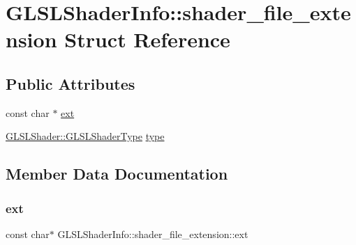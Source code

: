 \hypertarget{struct_g_l_s_l_shader_info_1_1shader__file__extension}{}\section{G\+L\+S\+L\+Shader\+Info\+::shader\+\_\+file\+\_\+extension Struct Reference}
\label{struct_g_l_s_l_shader_info_1_1shader__file__extension}
\subsection*{Public Attributes}
\begin{DoxyCompactItemize}
\item 
const char $\ast$ \mbox{\hyperlink{struct_g_l_s_l_shader_info_1_1shader__file__extension_a9afe94475a4fe6bdd60bb82b32a3f704}{ext}}
\item 
\mbox{\hyperlink{namespace_g_l_s_l_shader_a5da03bdfde28d414fcf090182b3b8177}{G\+L\+S\+L\+Shader\+::\+G\+L\+S\+L\+Shader\+Type}} \mbox{\hyperlink{struct_g_l_s_l_shader_info_1_1shader__file__extension_a5578163c6bc29380ee555c787a098b4f}{type}}
\end{DoxyCompactItemize}


\subsection{Member Data Documentation}
\mbox{\label{struct_g_l_s_l_shader_info_1_1shader__file__extension_a9afe94475a4fe6bdd60bb82b32a3f704}} 
\subsubsection{\texorpdfstring{ext}{ext}}
{\footnotesize\ttfamily const char$\ast$ G\+L\+S\+L\+Shader\+Info\+::shader\+\_\+file\+\_\+extension\+::ext}

\mbox{\label{struct_g_l_s_l_shader_info_1_1shader__file__extension_a5578163c6bc29380ee555c787a098b4f}} 
